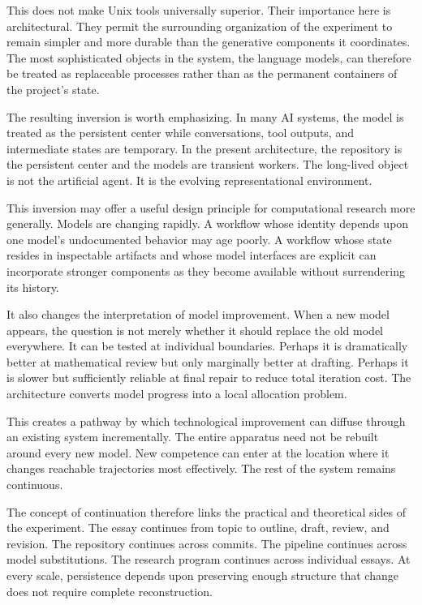 \documentclass[11pt]{article}
\begin{document}
This does not make Unix tools universally superior. Their importance here is architectural. They permit the surrounding organization of the experiment to remain simpler and more durable than the generative components it coordinates. The most sophisticated objects in the system, the language models, can therefore be treated as replaceable processes rather than as the permanent containers of the project's state.

The resulting inversion is worth emphasizing. In many AI systems, the model is treated as the persistent center while conversations, tool outputs, and intermediate states are temporary. In the present architecture, the repository is the persistent center and the models are transient workers. The long-lived object is not the artificial agent. It is the evolving representational environment.

This inversion may offer a useful design principle for computational research more generally. Models are changing rapidly. A workflow whose identity depends upon one model's undocumented behavior may age poorly. A workflow whose state resides in inspectable artifacts and whose model interfaces are explicit can incorporate stronger components as they become available without surrendering its history.

It also changes the interpretation of model improvement. When a new model appears, the question is not merely whether it should replace the old model everywhere. It can be tested at individual boundaries. Perhaps it is dramatically better at mathematical review but only marginally better at drafting. Perhaps it is slower but sufficiently reliable at final repair to reduce total iteration cost. The architecture converts model progress into a local allocation problem.

This creates a pathway by which technological improvement can diffuse through an existing system incrementally. The entire apparatus need not be rebuilt around every new model. New competence can enter at the location where it changes reachable trajectories most effectively. The rest of the system remains continuous.

The concept of continuation therefore links the practical and theoretical sides of the experiment. The essay continues from topic to outline, draft, review, and revision. The repository continues across commits. The pipeline continues across model substitutions. The research program continues across individual essays. At every scale, persistence depends upon preserving enough structure that change does not require complete reconstruction.
\end{document}
